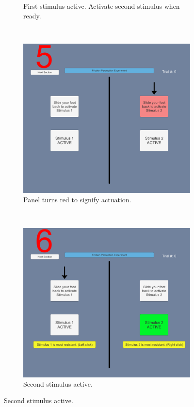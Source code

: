 \documentclass [12pt,letterpaper]{report}
\begin{document}
\begin{figure}[t!]
\begin{subfigure}[t]{0.5\textwidth}
        \caption{First stimulus active. Activate second stimulus when ready.}
    \end{subfigure}
    ~
    \begin{subfigure}[t]{0.5\textwidth}
        \centering
        \includegraphics[scale=0.215]{fig/perception_interface5}
        \caption{Panel turns red to signify actuation.}
    \end{subfigure}%
    ~ 
    \begin{subfigure}[t]{0.5\textwidth}
        \centering
        \includegraphics[scale=0.215]{fig/perception_interface6}
        \caption{Second stimulus active.}
    \end{subfigure}
    

\end{figure}
\end{document}
